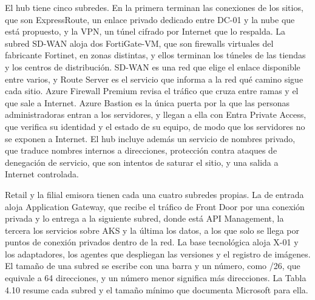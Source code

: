 \documentclass[11pt]{article}
\begin{document}
El hub tiene cinco subredes. En la primera terminan las conexiones de los sitios, que son ExpressRoute, un enlace privado dedicado entre DC-01 y la nube que está propuesto, y la VPN, un túnel cifrado por Internet que lo respalda. La subred SD-WAN aloja dos FortiGate-VM, que son firewalls virtuales del fabricante Fortinet, en zonas distintas, y ellos terminan los túneles de las tiendas y los centros de distribución. SD-WAN es una red que elige el enlace disponible entre varios, y Route Server es el servicio que informa a la red qué camino sigue cada sitio. Azure Firewall Premium revisa el tráfico que cruza entre ramas y el que sale a Internet. Azure Bastion es la única puerta por la que las personas administradoras entran a los servidores, y llegan a ella con Entra Private Access, que verifica su identidad y el estado de su equipo, de modo que los servidores no se exponen a Internet. El hub incluye además un servicio de nombres privado, que traduce nombres internos a direcciones, protección contra ataques de denegación de servicio, que son intentos de saturar el sitio, y una salida a Internet controlada.

Retail y la filial emisora tienen cada una cuatro subredes propias. La de entrada aloja Application Gateway, que recibe el tráfico de Front Door por una conexión privada y lo entrega a la siguiente subred, donde está API Management, la tercera los servicios sobre AKS y la última los datos, a los que solo se llega por puntos de conexión privados dentro de la red. La base tecnológica aloja X-01 y los adaptadores, los agentes que despliegan las versiones y el registro de imágenes. El tamaño de una subred se escribe con una barra y un número, como /26, que equivale a 64 direcciones, y un número menor significa más direcciones. La Tabla 4.10 resume cada subred y el tamaño mínimo que documenta Microsoft para ella.

\par\vspace{0pt plus 10\baselineskip}\vspace{0pt plus -10\baselineskip}
\end{document}
